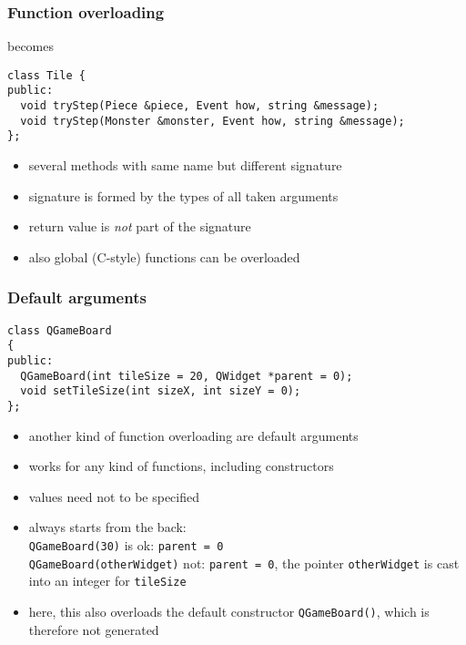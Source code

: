 \documentclass{slides}
\begin{document}
\begin{frame}[fragile]
  \frametitle{Function overloading}
  
  \begin{center}
  \end{center}
  becomes
  \medskip
\begin{lstlisting}
class Tile {
public:
  void tryStep(Piece &piece, Event how, string &message);
  void tryStep(Monster &monster, Event how, string &message);
};
\end{lstlisting}

  \begin{itemize}
  \item several methods with same name but different signature
  \item signature is formed by the types of all taken arguments
  \item return value is \emph{not} part of the signature
  \item also global (C-style) functions can be overloaded
  \end{itemize}
\end{frame}

\begin{frame}[fragile]
  \frametitle{Default arguments}
  
\begin{lstlisting}
class QGameBoard
{
public:
  QGameBoard(int tileSize = 20, QWidget *parent = 0);
  void setTileSize(int sizeX, int sizeY = 0);
};
\end{lstlisting}

  \begin{itemize}
  \item another kind of function overloading are default arguments
  \item works for any kind of functions, including constructors
  \item values need not to be specified
  \item always starts from the back:\\
    \lstinline!QGameBoard(30)! is ok: \lstinline!parent = 0!\\
    \lstinline!QGameBoard(otherWidget)! not:
    \lstinline!parent = 0!, the pointer \lstinline!otherWidget! is cast into an
    integer for \lstinline!tileSize!
  \item here, this also overloads the default constructor
    \lstinline!QGameBoard()!, which is therefore not generated
  \end{itemize}

\end{frame}
\end{document}
